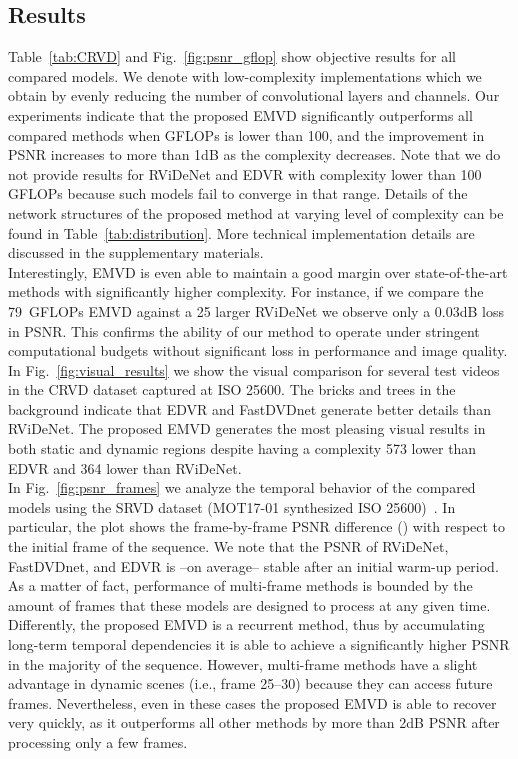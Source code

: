 \documentclass[final]{cvpr}
\newcommand{\textapprox}{}
\begin{document}
    \subsection{Results} 
    
    Table~\ref{tab:CRVD} and Fig.~\ref{fig:psnr_gflop} show objective results for all compared models. We denote with  low-complexity implementations which we obtain by evenly reducing the number of convolutional layers and channels. Our experiments indicate that the proposed EMVD significantly outperforms all compared methods when GFLOPs is lower than 100, and the improvement in PSNR increases to more than 1dB as the complexity decreases. Note that we do not provide results for RViDeNet and EDVR with complexity lower than 100 GFLOPs because such models fail to converge in that range. Details of the network structures of the proposed method at varying level of complexity can be found in Table~\ref{tab:distribution}. More technical implementation details are discussed in the supplementary materials. \\
    \indent Interestingly, EMVD is even able to maintain a good margin over state-of-the-art methods with significantly higher complexity. For instance, if we compare the \textapprox79~GFLOPs EMVD against a 25 larger RViDeNet we observe only a 0.03dB loss in PSNR. This confirms the ability of our method to operate under stringent computational budgets without significant loss in performance and image quality. In Fig.~\ref{fig:visual_results} we show the visual comparison for several test videos in the CRVD dataset captured at ISO 25600. The bricks and trees in the background indicate that EDVR and FastDVDnet generate better details than RViDeNet. The proposed EMVD generates the most pleasing visual results in both static and dynamic regions despite having a complexity 573 lower than EDVR and 364 lower than RViDeNet.\\
    \indent In Fig.~\ref{fig:psnr_frames} we analyze the temporal behavior of the compared models using the SRVD dataset (MOT17-01 synthesized ISO 25600)~\cite{chen2018sid,yue2020supervised}. In particular, the plot shows the frame-by-frame PSNR difference () with respect to the initial frame of the sequence. We note that the  PSNR of RViDeNet, FastDVDnet, and EDVR is --on average-- stable after an initial warm-up period. As a matter of fact, performance of multi-frame methods is bounded by the amount of frames that these models are designed to process at any given time. Differently, the proposed EMVD is a recurrent method, thus by accumulating long-term temporal dependencies it is able to achieve a significantly higher  PSNR in the majority of the sequence. However, multi-frame methods have a slight advantage in dynamic scenes (i.e., frame 25--30) because they can access future frames. Nevertheless, even in these cases the proposed EMVD is able to recover very quickly, as it outperforms all other methods by more than 2dB PSNR after processing only a few frames.\\
\end{document}
